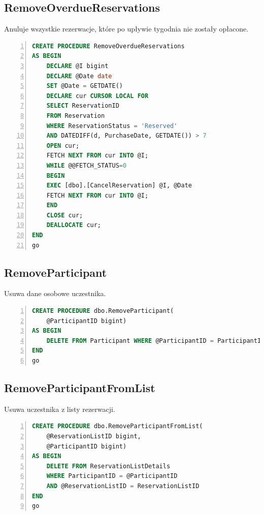 \documentclass[]{article}
\begin{document}
	\subsection{RemoveOverdueReservations}
	Anuluje wszystkie rezerwacje, które po upływie tygodnia nie zostały opłacone.
	\begin{lstlisting}[language=SQL,
						showspaces=false,
						basicstyle=\ttfamily,
						numbers=left,
						numberstyle=\tiny,
						backgroundcolor=\color{lightg},
						keywordstyle=\color{lightblue},
						commentstyle=\color{gray}]
CREATE PROCEDURE RemoveOverdueReservations
AS BEGIN
	DECLARE @I bigint
	DECLARE @Date date
	SET @Date = GETDATE()
	DECLARE cur CURSOR LOCAL FOR
	SELECT ReservationID
	FROM Reservation
	WHERE ReservationStatus = 'Reserved'
	AND DATEDIFF(d, PurchaseDate, GETDATE()) > 7
	OPEN cur;
	FETCH NEXT FROM cur INTO @I;
	WHILE @@FETCH_STATUS=0
	BEGIN
	EXEC [dbo].[CancelReservation] @I, @Date
	FETCH NEXT FROM cur INTO @I;
	END
	CLOSE cur;
	DEALLOCATE cur;
END
go
	\end{lstlisting}
	
	\subsection{RemoveParticipant}
	Usuwa dane osobowe uczestnika.
	\begin{lstlisting}[language=SQL,
						showspaces=false,
						basicstyle=\ttfamily,
						numbers=left,
						numberstyle=\tiny,
						backgroundcolor=\color{lightg},
						keywordstyle=\color{lightblue},
						commentstyle=\color{gray}]
CREATE PROCEDURE dbo.RemoveParticipant(
	@ParticipantID bigint)
AS BEGIN
	DELETE FROM Participant WHERE @ParticipantID = ParticipantID
END
go
	\end{lstlisting}
	
	\subsection{RemoveParticipantFromList}
	Usuwa uczestnika z listy rezerwacji.
	\begin{lstlisting}[language=SQL,
						showspaces=false,
						basicstyle=\ttfamily,
						numbers=left,
						numberstyle=\tiny,
						backgroundcolor=\color{lightg},
						keywordstyle=\color{lightblue},
						commentstyle=\color{gray}]
CREATE PROCEDURE dbo.RemoveParticipantFromList(
	@ReservationListID bigint,
	@ParticipantID bigint)
AS BEGIN
	DELETE FROM ReservationListDetails
	WHERE ParticipantID = @ParticipantID
	AND @ReservationListID = ReservationListID
END
go
	\end{lstlisting}
	
\end{document}
